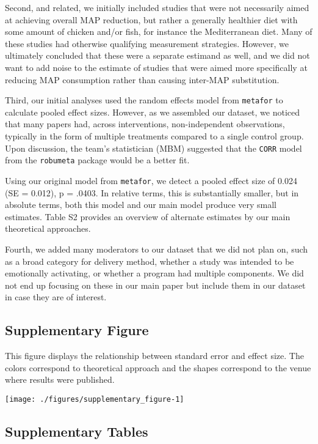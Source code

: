\documentclass[sn-nature,pdflatex]{sn-jnl}
\begin{document}
Second, and related, we initially included studies that were not
necessarily aimed at achieving overall MAP reduction, but rather a
generally healthier diet with some amount of chicken and/or fish, for
instance the Mediterranean diet. Many of these studies had otherwise
qualifying measurement strategies. However, we ultimately concluded that
these were a separate estimand as well, and we did not want to add noise
to the estimate of studies that were aimed more specifically at reducing
MAP consumption rather than causing inter-MAP substitution.

Third, our initial analyses used the random effects model from
\texttt{metafor} to calculate pooled effect sizes. However, as we
assembled our dataset, we noticed that many papers had, across
interventions, non-independent observations, typically in the form of
multiple treatments compared to a single control group. Upon discussion,
the team's statistician (MBM) suggested that the \texttt{CORR} model
from the \texttt{robumeta} package would be a better fit.

Using our original model from \texttt{metafor}, we detect a pooled
effect size of 0.024 (SE = 0.012), p = .0403. In relative terms, this is
substantially smaller, but in absolute terms, both this model and our
main model produce very small estimates. Table S2 provides an overview
of alternate estimates by our main theoretical approaches.

Fourth, we added many moderators to our dataset that we did not plan on,
such as a broad category for delivery method, whether a study was
intended to be emotionally activating, or whether a program had multiple
components. We did not end up focusing on these in our main paper but
include them in our dataset in case they are of interest.

\subsection{Supplementary Figure}\label{supplementary-figure}

This figure displays the relationship between standard error and effect
size. The colors correspond to theoretical approach and the shapes
correspond to the venue where results were published.

\texttt{[image: ./figures/supplementary\_figure-1]}

\subsection{Supplementary Tables}\label{supplementary-tables}
\end{document}
